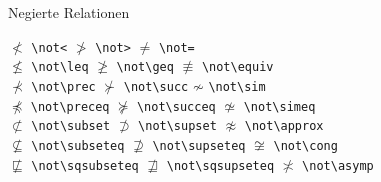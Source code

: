\begin{table}[!htbp]
\caption{Negierte Relationen}
\begin{symbols}
$\not< $\> \verb|\not<| \>$\not> $\> \verb|\not>| \>$\not= $\> \verb|\not=| \\
$\not\leq $\> \verb|\not\leq| \>$\not\geq $\> \verb|\not\geq| \>
  $\not\equiv $\> \verb|\not\equiv| \\
$\not\prec $\> \verb|\not\prec| \>$\not\succ $\> \verb|\not\succ| \>
  $\not\sim $\> \verb|\not\sim| \\
$\not\preceq $\> \verb|\not\preceq| \>$\not\succeq $\> \verb|\not\succeq| \>
  $\not\simeq $\> \verb|\not\simeq| \\
$\not\subset $\> \verb|\not\subset| \>$\not\supset $\> \verb|\not\supset| \>
  $\not\approx $\> \verb|\not\approx| \\
$\not\subseteq $\> \verb|\not\subseteq| \>$\not\supseteq $\>
\verb|\not\supseteq| \>
  $\not\cong $\> \verb|\not\cong| \\
$\not\sqsubseteq $\> \verb|\not\sqsubseteq| \>$\not\sqsupseteq $\>
\verb|\not\sqsupseteq| \>
  $\not\asymp $\> \verb|\not\asymp| \\
\end{symbols}
\end{table}


